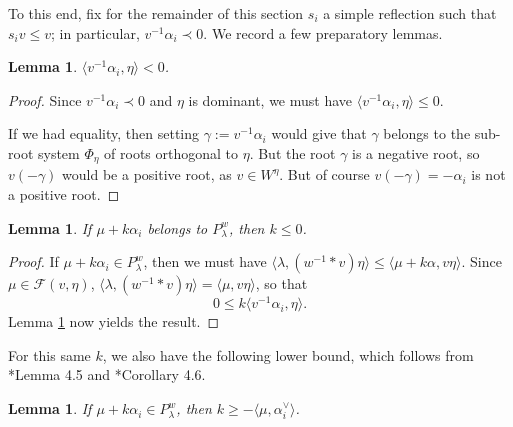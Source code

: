 \documentclass[12pt,reqno]{amsart}
\newtheorem{lemma}[theorem]{Lemma}
\theoremstyle{definition}
\begin{document}
To this end, fix for the remainder of this section $s_i$ a simple reflection such that $s_iv \le v$; in particular, $v^{-1} \alpha_i\prec 0$. We record a few preparatory lemmas. 

\begin{lemma} \label{ConvexLemma1}
$\langle v^{-1}\alpha_i, \eta\rangle < 0$.
\end{lemma}

\begin{proof}
Since $v^{-1}\alpha_i\prec 0$ and $\eta$ is dominant, we must have $\langle v^{-1} \alpha_i, \eta \rangle \le 0$. 

If we had equality, then setting $\gamma := v^{-1}\alpha_i$ would give that $\gamma$ belongs to the sub-root system $\Phi_\eta$ of roots orthogonal to $\eta$. But the root $\gamma$ is a negative root, so $v(-\gamma)$ would be a positive root, as $v \in W^\eta$. But of course $v(-\gamma)=-\alpha_i$ is not a positive root. 
\end{proof}


\begin{lemma} \label{ConvexLemma2}
If $\mu+ k\alpha_i$ belongs to $P_\lambda^w$, then $k\le0$. 
\end{lemma}

\begin{proof}
If $\mu+k\alpha_i \in P^w_\lambda$, then we must have $\langle \lambda, (w^{-1}*v) \eta \rangle \le \langle \mu + k\alpha , v\eta \rangle$. Since $\mu \in \mathcal{F}(v, \eta)$, $\langle \lambda, (w^{-1} \ast v) \eta \rangle =\langle \mu, v\eta \rangle$, so that 
$$
0 \le k \langle v^{-1}\alpha_i, \eta \rangle.
$$
Lemma \ref{ConvexLemma1} now yields the result. 
\end{proof}


For this same $k$, we also have the following lower bound, which follows from \cite{BJK2}*{Lemma 4.5} and \cite{BJK2}*{Corollary 4.6}.

\begin{lemma} \label{ConvexLemma3}
If $\mu+k\alpha_i \in P^w_\lambda$, then $k \ge - \langle \mu, \alpha_i^\vee \rangle$. 
\end{lemma}
\end{document}

